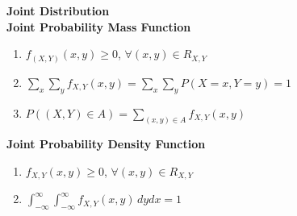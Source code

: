 \documentclass[a4paper, 12pt]{article}
\begin{document}
\begin{multicols*}{3}
\medskip

{\small\textbf{Joint Distribution}} \\
\textbf{Joint Probability Mass Function}
\begin{enumerate}
    \item $f_{(X, Y)}(x, y) \geq 0$, $\forall (x, y) \in R_{X, Y}$
    \item $\sum_x \sum_y f_{X,Y}(x, y) = \sum_x \sum_y P(X = x, Y = y) = 1$
    \item $P((X, Y) \in A) = \sum_{(x, y) \in A} f_{X, Y}(x, y)$
\end{enumerate}
\textbf{Joint Probability Density Function}
\begin{enumerate}
    \item $f_{X, Y}(x,y) \geq 0$, $\forall (x, y) \in R_{X, Y}$
    \item $\int_{-\infty}^{\infty}\int_{-\infty}^{\infty}f_{X,Y}(x,y) \, dydx = 1$
\end{enumerate}

\medskip


\end{multicols*}
\end{document}
